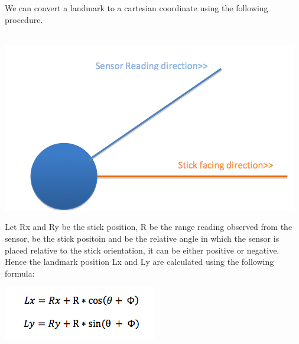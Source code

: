 \documentclass[12pt]{article}
\begin{document}
We can convert a landmark to a cartesian coordinate using the following procedure.\\
\\
\begin{center} \includegraphics[scale=0.4]{pic2} \end{center}
Let Rx and Ry be the stick position, R be the range reading observed from the sensor, be the stick positoin and be the relative angle in which the sensor is placed relative to the stick orientation, it can be either positive or negative. Hence the landmark position Lx and Ly are calculated using the following formula:\\
\begin{center} \includegraphics[scale=0.4]{pic3} \end{center}
\end{document}
